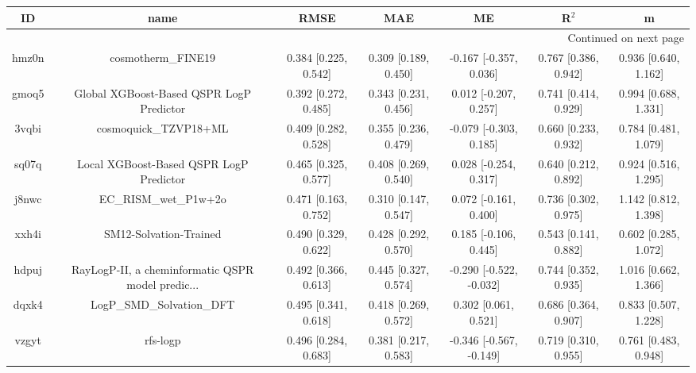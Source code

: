 \documentclass{article}
\begin{document}
\begin{center}
\begin{longtable}{|ccccccc|}
\toprule
    ID &                                               name &                  RMSE &                   MAE &                       ME &                 R$^2$ &                       m \\
\midrule
\endhead
\midrule
\multicolumn{7}{r}{{Continued on next page}} \\
\midrule
\endfoot

\bottomrule
\endlastfoot
 hmz0n &                                 cosmotherm\_FINE19 &  0.384 [0.225, 0.542] &  0.309 [0.189, 0.450] &   -0.167 [-0.357, 0.036] &  0.767 [0.386, 0.942] &    0.936 [0.640, 1.162] \\
 gmoq5 &           Global XGBoost-Based QSPR LogP Predictor &  0.392 [0.272, 0.485] &  0.343 [0.231, 0.456] &    0.012 [-0.207, 0.257] &  0.741 [0.414, 0.929] &    0.994 [0.688, 1.331] \\
 3vqbi &                              cosmoquick\_TZVP18+ML &  0.409 [0.282, 0.528] &  0.355 [0.236, 0.479] &   -0.079 [-0.303, 0.185] &  0.660 [0.233, 0.932] &    0.784 [0.481, 1.079] \\
 sq07q &            Local XGBoost-Based QSPR LogP Predictor &  0.465 [0.325, 0.577] &  0.408 [0.269, 0.540] &    0.028 [-0.254, 0.317] &  0.640 [0.212, 0.892] &    0.924 [0.516, 1.295] \\
 j8nwc &                              EC\_RISM\_wet\_P1w+2o &  0.471 [0.163, 0.752] &  0.310 [0.147, 0.547] &    0.072 [-0.161, 0.400] &  0.736 [0.302, 0.975] &    1.142 [0.812, 1.398] \\
 xxh4i &                             SM12-Solvation-Trained &  0.490 [0.329, 0.622] &  0.428 [0.292, 0.570] &    0.185 [-0.106, 0.445] &  0.543 [0.141, 0.882] &    0.602 [0.285, 1.072] \\
 hdpuj &  RayLogP-II, a cheminformatic QSPR model predic... &  0.492 [0.366, 0.613] &  0.445 [0.327, 0.574] &  -0.290 [-0.522, -0.032] &  0.744 [0.352, 0.935] &    1.016 [0.662, 1.366] \\
 dqxk4 &                          LogP\_SMD\_Solvation\_DFT &  0.495 [0.341, 0.618] &  0.418 [0.269, 0.572] &     0.302 [0.061, 0.521] &  0.686 [0.364, 0.907] &    0.833 [0.507, 1.228] \\
 vzgyt &                                           rfs-logp &  0.496 [0.284, 0.683] &  0.381 [0.217, 0.583] &  -0.346 [-0.567, -0.149] &  0.719 [0.310, 0.955] &    0.761 [0.483, 0.948] \\

\end{longtable}
\end{center}
\end{document}
